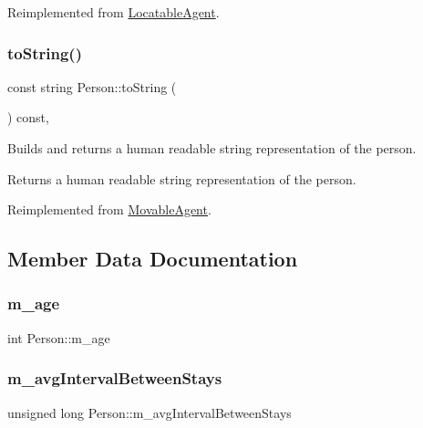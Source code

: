 Reimplemented from \hyperlink{class_locatable_agent_a754b237c404b77714fedd397f214bc02}{Locatable\+Agent}.

\mbox{\label{class_person_a68872538da519d0a04297f43376db27c}} 
\subsubsection{\texorpdfstring{to\+String()}{toString()}}
{\footnotesize\ttfamily const string Person\+::to\+String (\begin{DoxyParamCaption}{ }\end{DoxyParamCaption}) const\hspace{0.3cm}{\ttfamily [override]}, {\ttfamily [virtual]}}

Builds and returns a human readable string representation of the person. \begin{DoxyReturn}{Returns}
a human readable string representation of the person. 
\end{DoxyReturn}


Reimplemented from \hyperlink{class_movable_agent_a1dee2a6bf93f01006fadfb6fba6c9a59}{Movable\+Agent}.



\subsection{Member Data Documentation}
\mbox{\label{class_person_a743e071da10a5ac9150f61df919cfbb4}} 
\subsubsection{\texorpdfstring{m\+\_\+age}{m\_age}}
{\footnotesize\ttfamily int Person\+::m\+\_\+age\hspace{0.3cm}{\ttfamily [private]}}

\mbox{\label{class_person_a62a07c9565931a618a09be7510dde07c}} 
\subsubsection{\texorpdfstring{m\+\_\+avg\+Interval\+Between\+Stays}{m\_avgIntervalBetweenStays}}
{\footnotesize\ttfamily unsigned long Person\+::m\+\_\+avg\+Interval\+Between\+Stays\hspace{0.3cm}{\ttfamily [private]}}

